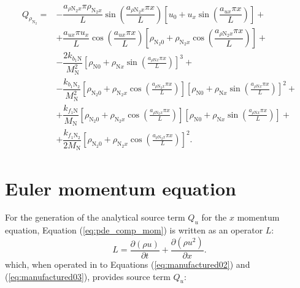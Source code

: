 \documentclass[10pt]{article}
\newcommand{\Diff}[2] {\dfrac{\partial( #1)}{\partial #2}}
\begin{document}
\begin{equation}
\begin{split}
Q_{\rho_{\text{N}_2}} = &- \dfrac{a_{ \rho \text{N}_2 x } \pi \rho_{\text{N}_2 x}}{L}\sin\left( \dfrac{a_{ \rho \text{N}_2 x } \pi x}{L}\right) \left[u_0+u_x \sin\left( \dfrac{a_{ux} \pi x}{L}\right)\right] + \\
&+\dfrac{a_{ux} \pi u_x }{L}\cos\left( \dfrac{a_{ux} \pi x}{L}\right) \left[\rho_{\text{N}_2 0}+\rho_{\text{N}_2 x} \cos\left( \dfrac{a_{ \rho \text{N}_2 x } \pi x}{L}\right)\right] + \\
&- \dfrac{ 2 k_{b_1 \text{N}}}{M_{\text{N}}^2} \left[\rho_{\text{N}0} + \rho_{\text{N}x} \sin\left(\frac{a_{ \rho \text{N} x} \pi x}{L}\right)\right]^3 +\\
& - \dfrac{ k_{b_1 \text{N}_2}}{M_{\text{N}}^2} \left[\rho_{\text{N}_2 0}+ \rho_{\text{N}_2 x} \cos\left(\frac{a_{ \rho \text{N}_2 x} \pi x}{L}\right)\right] \left[\rho_{\text{N}0} + \rho_{\text{N}x} \sin\left(\frac{a_{ \rho \text{N} x} \pi x}{L}\right)\right]^2 +\\
&+ \dfrac{ k_{f_1 \text{N}} }{M_{\text{N}}} \left[\rho_{\text{N}_2 0}+ \rho_{\text{N}_2 x} \cos\left(\frac{a_{ \rho \text{N}_2 x} \pi x}{L}\right)\right] \left[\rho_{\text{N}0} + \rho_{\text{N}x} \sin\left(\frac{a_{ \rho \text{N} x} \pi x}{L}\right)\right]+\\
&+ \dfrac{k_{f_1 \text{N}_2} }{2 M_{\text{N}}} \left[\rho_{\text{N}_2 0}+ \rho_{\text{N}_2 x} \cos\left(\frac{a_{ \rho \text{N}_2 x} \pi x}{L}\right)\right]^2.
\end{split}
\end{equation}




\section{Euler momentum equation}

For the generation of the analytical source term $Q_u$ for the $x$ momentum equation, Equation (\ref{eq:pde_comp_mom}) is written as an operator $L$:
\begin{equation}
 \label{eq:euler1d_12}
L=\Diff{\rho u}{t} + \Diff{\rho u^2}{x}.
\end{equation}
which, when operated in to Equations (\ref{eq:manufactured02}) and (\ref{eq:manufactured03}), provides source term $Q_{u}$:
\end{document}
